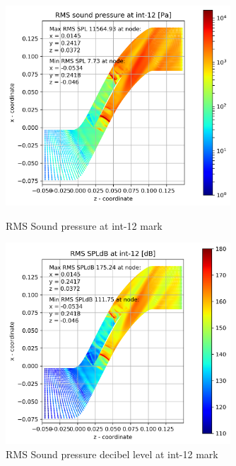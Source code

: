 \begin{figure}[ht]
  \centering
  \includegraphics[width=0.75\textwidth]{Figures/int-12-rms-spl.png} 
  \caption{RMS Sound pressure at int-12 mark} \label{int-12-rms-spl}
  
  \vspace*{\floatsep}%

  \includegraphics[width=0.75\textwidth]{Figures/int-12-rms-spldb.png} 
  \caption{RMS Sound pressure decibel level at int-12 mark} \label{int-12-rms-spldb}
\end{figure}
